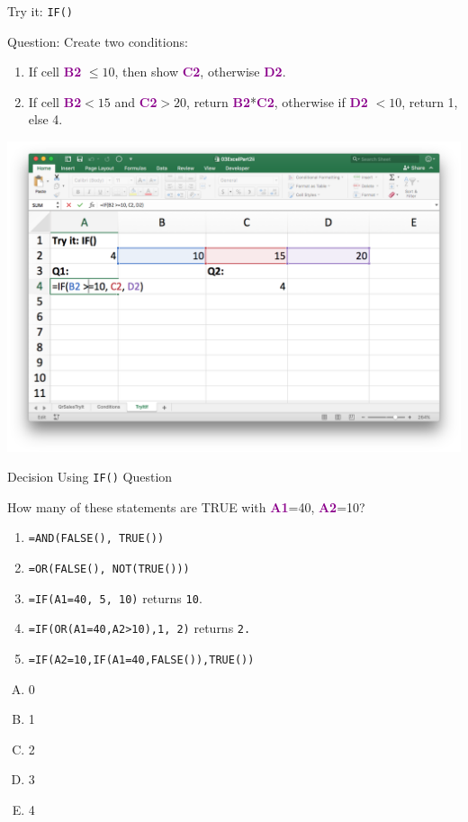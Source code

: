 \documentclass[xcolor=svgnames, handout]{beamer}
\newcommand{\cell}[1]{{\sf \textbf{\textcolor{DarkMagenta}{#1}}}}
\begin{document}
\begin{frame}{Try it: {\tt IF()}}
\begin{exampleblock}{}{Question: Create two conditions:}
\begin{enumerate}
\item If cell \cell{B2} $\leq 10$, then show \cell{C2}, otherwise \cell{D2}.
\item If cell  \cell{B2}$ < 15$ and \cell{C2}$ > 20$, return \cell{B2}*\cell{C2}, otherwise if \cell{D2} $ < 10$, return 1, else 4.
\end{enumerate}
\end{exampleblock}
\begin{center}
\includegraphics[width=.9\textwidth]{TryItIf2.png}
\end{center}
\end{frame}

\begin{frame}[fragile]{Decision Using {\tt IF()} Question}
  \begin{example}
How many of these statements are TRUE with \cell{A1}=40, \cell{A2}=10?
 \begin{enumerate}
\item \verb|=AND(FALSE(), TRUE())|
\item \verb|=OR(FALSE(), NOT(TRUE()))|
\item \verb|=IF(A1=40, 5, 10)| returns {\tt 10}.
\item \verb|=IF(OR(A1=40,A2>10),1, 2)| returns \tt 2.
\item \verb|=IF(A2=10,IF(A1=40,FALSE()),TRUE())|
 \end{enumerate}
\begin{multicols}{5}
\begin{enumerate}[A)]
\item 0 
\item 1
\item 2
\item 3
\item 4
\end{enumerate}
\end{multicols}
  \end{example} 
\end{frame}
\end{document}

